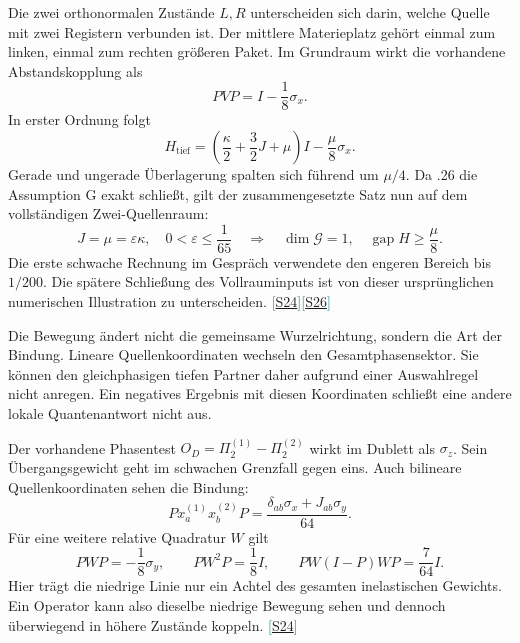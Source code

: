 \documentclass[11pt,a4paper,oneside,parskip=half,headings=normal,numbers=noenddot,bibliography=totoc]{scrreprt}
\newcommand{\gap}{\operatorname{gap}}
\newcommand{\src}[1]{\textcolor{teal}{\small[\hyperref[s:#1]{S#1}]}}
\newcommand{\finding}[2]{\begin{tcolorbox}[enhanced,breakable,colback=pale,colframe=teal,boxrule=0pt,borderline west={2pt}{0pt}{teal},arc=0mm,left=3mm,right=3mm,top=2mm,bottom=2mm,title={#1},coltitle=ink,colbacktitle=pale,fonttitle=\sffamily\bfseries]#2\end{tcolorbox}}
\begin{document}
Die zwei orthonormalen Zustände $L,R$ unterscheiden sich darin, welche Quelle mit zwei Registern verbunden ist. Der mittlere Materieplatz gehört einmal zum linken, einmal zum rechten größeren Paket. Im Grundraum wirkt die vorhandene Abstandskopplung als
\[
 PVP=I-\frac18\sigma_x.
\]
In erster Ordnung folgt
\[
 H_{\mathrm{tief}}=
 \left(\frac\kappa2+\frac32J+\mu\right)I-\frac\mu8\sigma_x.
\]
Gerade und ungerade Überlagerung spalten sich führend um $\mu/4$. Da .26 die Assumption G exakt schließt, gilt der zusammengesetzte Satz nun auf dem vollständigen Zwei-Quellenraum:
\[
 J=\mu=\varepsilon\kappa,\quad0<\varepsilon\le\frac1{65}
 \quad\Longrightarrow\quad\dim\mathcal G=1,\quad\gap H\ge\frac\mu8.
\]
Die erste schwache Rechnung im Gespräch verwendete den engeren Bereich bis $1/200$. Die spätere Schließung des Vollrauminputs ist von dieser ursprünglichen numerischen Illustration zu unterscheiden. \src{24}\src{26}

\finding{Der wichtige blinde Fleck}{Die Bewegung ändert nicht die gemeinsame Wurzelrichtung, sondern die Art der Bindung. Lineare Quellenkoordinaten wechseln den Gesamtphasensektor. Sie können den gleichphasigen tiefen Partner daher aufgrund einer Auswahlregel nicht anregen. Ein negatives Ergebnis mit diesen Koordinaten schließt eine andere lokale Quantenantwort nicht aus.}

Der vorhandene Phasentest $O_D=\Pi_2^{(1)}-\Pi_2^{(2)}$ wirkt im Dublett als $\sigma_z$. Sein Übergangsgewicht geht im schwachen Grenzfall gegen eins. Auch bilineare Quellenkoordinaten sehen die Bindung:
\[
 P x_a^{(1)}x_b^{(2)}P
 =\frac{\delta_{ab}\sigma_x+J_{ab}\sigma_y}{64}.
\]
Für eine weitere relative Quadratur $W$ gilt
\[
 PWP=-\frac18\sigma_y,\qquad PW^2P=\frac18I,\qquad
 PW(I-P)WP=\frac7{64}I.
\]
Hier trägt die niedrige Linie nur ein Achtel des gesamten inelastischen Gewichts. Ein Operator kann also dieselbe niedrige Bewegung sehen und dennoch überwiegend in höhere Zustände koppeln. \src{24}
\end{document}
